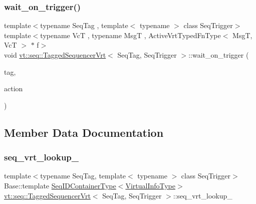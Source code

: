 \mbox{\label{structvt_1_1seq_1_1_tagged_sequencer_vrt_a768f8c419f42b3dad84ebce3f046f0e9}} 
\subsubsection{\texorpdfstring{wait\+\_\+on\+\_\+trigger()}{wait\_on\_trigger()}}
{\footnotesize\ttfamily template$<$typename Seq\+Tag , template$<$ typename $>$ class Seq\+Trigger$>$ \\
template$<$typename VcT , typename MsgT , Active\+Vrt\+Typed\+Fn\+Type$<$ Msg\+T, Vc\+T $>$ $\ast$ f$>$ \\
void \hyperlink{structvt_1_1seq_1_1_tagged_sequencer_vrt}{vt\+::seq\+::\+Tagged\+Sequencer\+Vrt}$<$ Seq\+Tag, Seq\+Trigger $>$\+::wait\+\_\+on\+\_\+trigger (\begin{DoxyParamCaption}\item[{\hyperlink{namespacevt_a84ab281dae04a52a4b243d6bf62d0e52}{Tag\+Type} const \&}]{tag,  }\item[{\hyperlink{structvt_1_1seq_1_1_tagged_sequencer_a0210dbd34288d440e0cd51db9d6637bd}{Seq\+Action\+Type}$<$ MsgT, VcT $>$}]{action }\end{DoxyParamCaption})}



\subsection{Member Data Documentation}
\mbox{\label{structvt_1_1seq_1_1_tagged_sequencer_vrt_a213529bb66256be822694bb39d7cce0f}} 
\subsubsection{\texorpdfstring{seq\+\_\+vrt\+\_\+lookup\+\_\+}{seq\_vrt\_lookup\_}}
{\footnotesize\ttfamily template$<$typename Seq\+Tag, template$<$ typename $>$ class Seq\+Trigger$>$ \\
Base\+::template \hyperlink{structvt_1_1seq_1_1_tagged_sequencer_a718515267468123a9036c30033d74237}{Seq\+I\+D\+Container\+Type}$<$\hyperlink{structvt_1_1seq_1_1_tagged_sequencer_vrt_a19c5f10f5710fee8cd202735af8aa17f}{Virtual\+Info\+Type}$>$ \hyperlink{structvt_1_1seq_1_1_tagged_sequencer_vrt}{vt\+::seq\+::\+Tagged\+Sequencer\+Vrt}$<$ Seq\+Tag, Seq\+Trigger $>$\+::seq\+\_\+vrt\+\_\+lookup\+\_\+\hspace{0.3cm}{\ttfamily [private]}}



